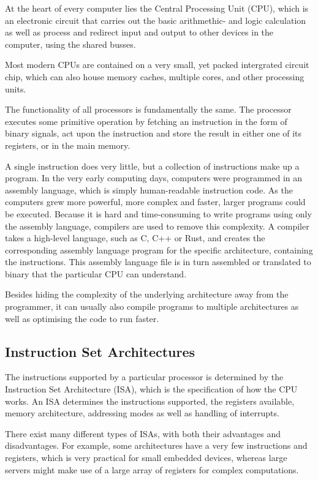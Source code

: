 At the heart of every computer lies the Central Processing Unit (CPU),
which is
an electronic circuit that carries out the basic arithmethic- and logic
calculation as well as process and redirect input and output to other devices
in the computer, using the shared busses.

Most modern CPUs are contained on a very small, yet packed intergrated circuit
chip, which can also house memory caches, multiple cores, and other processing
units.

The functionality of all processors is fundamentally the same. The processor
executes some primitive operation by fetching an instruction in the form of
binary signals, act upon the instruction and store the result in either
one of its registers, or in the main memory.

A single instruction does very little, but a collection of instructions
make up
a program. In the very early computing days, computers were programmed in an
assembly language, which is simply human-readable instruction code. As the
computers grew more powerful, more complex and faster, larger programs could be
executed. Because it is hard and time-consuming to write programs using
only the
assembly language, compilers are used to remove this complexity. A
compiler takes a high-level language, such as C, C++ or Rust, and creates the
corresponding assembly language program for the specific architecture,
containing the instructions. This assembly language file is in turn assembled
or translated to binary that the particular CPU can understand.

Besides hiding the complexity of the underlying architecture away from the
programmer, it can usually also compile programs to multiple architectures as
well as optimising the code to run faster.

\subsection{Instruction Set Architectures}
The instructions supported by a particular processor is determined by the
Instruction Set Architecture (ISA), which is the specification of how the CPU
works. An ISA determines the instructions
supported, the registers available, memory architecture, addressing modes as
well as handling of interrupts.

There exist many different types of ISAs, with both their advantages and
disadvantages. For example, some architectures have a very few instructions
and registers, which is very practical for small embedded devices,
whereas large
servers might make use of a large array of registers for complex computations.

